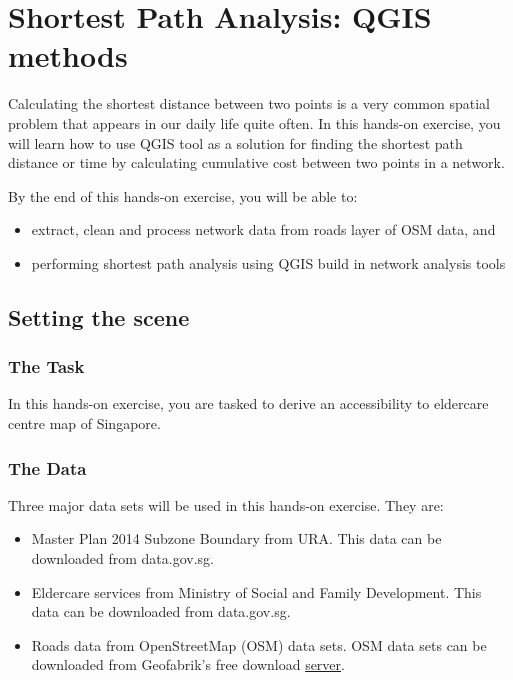 \documentclass[
  letterpaper,
  DIV=11,
  numbers=noendperiod]{scrreprt}
\providecommand{\tightlist}{%
  \setlength{\itemsep}{0pt}\setlength{\parskip}{0pt}}\usepackage{longtable,booktabs,array}
\begin{document}

\hypertarget{shortest-path-analysis-qgis-methods}{%
\chapter{Shortest Path Analysis: QGIS
methods}\label{shortest-path-analysis-qgis-methods}}

Calculating the shortest distance between two points is a very common
spatial problem that appears in our daily life quite often. In this
hands-on exercise, you will learn how to use QGIS tool as a solution for
finding the shortest path distance or time by calculating cumulative
cost between two points in a network.

By the end of this hands-on exercise, you will be able to:

\begin{itemize}
\tightlist
\item
  extract, clean and process network data from roads layer of OSM data,
  and
\item
  performing shortest path analysis using QGIS build in network analysis
  tools
\end{itemize}

\hypertarget{setting-the-scene-1}{%
\section{Setting the scene}\label{setting-the-scene-1}}

\hypertarget{the-task-2}{%
\subsection{The Task}\label{the-task-2}}

In this hands-on exercise, you are tasked to derive an accessibility to
eldercare centre map of Singapore.

\hypertarget{the-data-2}{%
\subsection{The Data}\label{the-data-2}}

Three major data sets will be used in this hands-on exercise. They are:

\begin{itemize}
\tightlist
\item
  Master Plan 2014 Subzone Boundary from URA. This data can be
  downloaded from data.gov.sg.
\item
  Eldercare services from Ministry of Social and Family Development.
  This data can be downloaded from data.gov.sg.
\item
  Roads data from OpenStreetMap (OSM) data sets. OSM data sets can be
  downloaded from Geofabrik's free download
  \href{https://download.geofabrik.de/}{server}.
\end{itemize}
\end{document}
